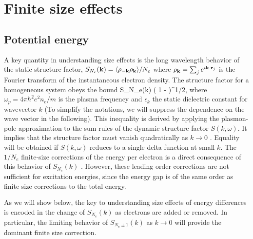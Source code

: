\section{Finite size effects\label{sec:bg-fse}}

\subsection{Potential energy}

A key quantity in understanding size effects is the long wavelength behavior of the static structure factor,
$S_{N_e}({\bf k})=\langle \rho_{-{\bf k}} \rho_{{\bf k}} \rangle/N_e$ where $\rho_{\bf k}=\sum_j e^{i {\bf k} \cdot {\bf r}_j}$ is the Fourier transform of the instantaneous electron density.
The structure factor for a homogeneous system obeys the bound \cite{Ceperley87,book}
\beq
S_{N_e}(k) \le {}\left( 1 -  \right)^{1/2},
\label{davidbound}
\eeq
where $\omega_p=4 \pi \hbar^2 e^2 n_e/m$ is the plasma frequency and $\epsilon_k$ the static dielectric constant for wavevector $k$ (To simplify the notations, we will suppress the dependence on the wave vector in the following). This inequality is derived by applying the plasmon-pole approximation to the sum rules of the dynamic structure factor $S(k, \omega)$. It implies that the structure factor must vanish quadratically as
$k \rightarrow 0$ \cite{Nozieres}.
Equality will be obtained if $S(k,\omega)$ reduces to a single delta function at small $k$.
The $1/N_e$ finite-size corrections of the energy per electron is a direct consequence of 
this behavior of $S_{N_e}(k)$ \cite{fse}. However, these leading order corrections are not sufficient for excitation energies, since the energy gap is of the same order as finite size corrections to the total energy.

As we will show below, the key to understanding size effects of energy differences is encoded in the change of $S_{N_e}(k)$ as electrons are added or removed. In particular, the limiting behavior of $S_{N_e\pm 1}(k)$ as $k\rightarrow0$ will provide the dominant finite size correction.

